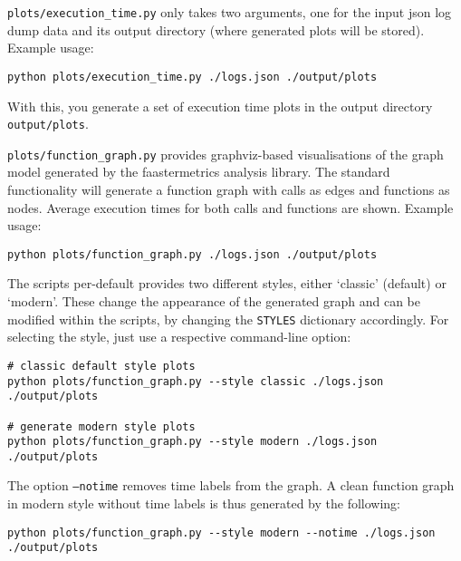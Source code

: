 \documentclass[../main.tex]{subfiles}
\begin{document}
\texttt{plots/execution\_time.py} only takes two arguments, one for the input json 
log dump data and its output directory (where generated plots will be stored).
Example usage:
\begin{tcolorbox}
\begin{verbatim}
python plots/execution_time.py ./logs.json ./output/plots
\end{verbatim}
\end{tcolorbox}\noindent
With this, you generate a set of execution time plots in the output directory \texttt{output/plots}. 

\texttt{plots/function\_graph.py} provides graphviz-based visualisations 
of the graph model generated by the faastermetrics analysis library.
The standard functionality will generate a function graph with calls as edges and functions as nodes. 
Average execution times for both calls and functions are shown.
Example usage:
\begin{tcolorbox}
\begin{verbatim}
python plots/function_graph.py ./logs.json ./output/plots
\end{verbatim}
\end{tcolorbox}\noindent


The scripts per-default provides two different styles, either `classic' (default) or `modern'. 
These change the appearance of the generated graph and can be modified within the scripts, 
by changing the \texttt{STYLES} dictionary accordingly. 
For selecting the style, just use a respective command-line option:
\begin{tcolorbox}
\begin{verbatim}
# classic default style plots
python plots/function_graph.py --style classic ./logs.json 
./output/plots

# generate modern style plots
python plots/function_graph.py --style modern ./logs.json 
./output/plots
\end{verbatim}
\end{tcolorbox}

The option \texttt{--notime} removes time labels from the graph. 
A clean function graph in modern style without time labels is thus generated by the following:
\begin{tcolorbox}
\begin{verbatim}
python plots/function_graph.py --style modern --notime ./logs.json 
./output/plots
\end{verbatim}
\end{tcolorbox}
\end{document}
